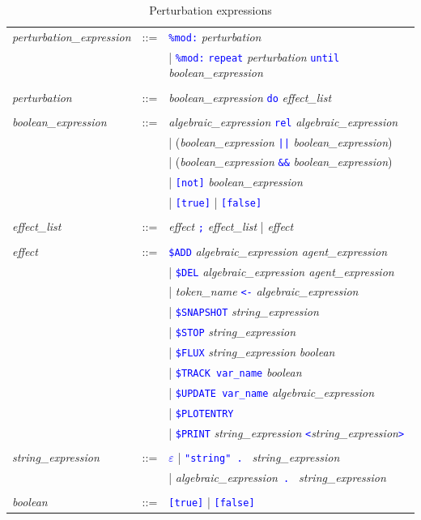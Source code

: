 \documentclass[11pt]{book}
\def\tcb#1{\textcolor{blue}{\ttt{#1}}}
\def\ttt#1{\texttt{#1}}
\def\var#1{{\textquotesingle}#1{\textquotesingle}}
\begin{document}
\begin{table}[htbp]
  \centering
  \caption{Perturbation expressions}
  \begin{tabular}{@{} lcl @{}}
  	\textit{perturbation\_expression} &::=& \tcb{\ttt{\%mod:}} \textit{perturbation} \\
	&& | \tcb{\ttt{\%mod:}} \tcb{\ttt{repeat}} \textit{perturbation} \tcb{\ttt{until}} \textit{boolean\_expression} \\\\

    \textit{perturbation} &::=& \textit{boolean\_expression} \tcb{\ttt{do}} \textit{effect\_list} \\\\
    \textit{boolean\_expression} &::=& \textit{algebraic\_expression}\index{boolean expression} \tcb{rel} \textit{algebraic\_expression} \\
    && | (\textit{boolean\_expression} \tcb{||} \textit{boolean\_expression}) \\
    && | (\textit{boolean\_expression} \tcb{\&\&} \textit{boolean\_expression}) \\
    && | \tcb{[not]} \textit{boolean\_expression} \\
    && | \tcb{[true]} | \tcb{[false]} \\\\
    \textit{effect\_list} &::=& \textit{effect} \tcb{\ttt {;}} \textit{effect\_list} | \textit{effect} \\\\
\textit{effect} &::=& \tcb{\$ADD} \textit{algebraic\_expression agent\_expression} \\
    && | \tcb{\$DEL} \textit{algebraic\_expression agent\_expression} \\
    && | \textit{token\_name} \tcb{<-} \textit{algebraic\_expression} \\
    && | \tcb{\$SNAPSHOT} \textit{string\_expression}\\
    && | \tcb{\$STOP} \textit{string\_expression}\\
	&& | \tcb{\$FLUX} \textit{string\_expression} \textit{boolean} \\
    && | \tcb{\$TRACK \var{var\_name}} \textit{boolean} \\
    && | \tcb{\$UPDATE \var{var\_name}} \textit{algebraic\_expression} \\
    && | \tcb{\$PLOTENTRY} \\
    && | \tcb{\$PRINT} \textit{string\_expression} \tcb{<}\textit{string\_expression}\tcb{>} \\
    \\
    \textit{string\_expression} &::=& \tcb{$\varepsilon$} | \tcb{"string" . } \textit{string\_expression} \\
    && | \textit{algebraic\_expression}\tcb{ . } \textit{string\_expression} \\\\
	\textit{boolean} &::=& \tcb{[true]} | \tcb{[false]}
  \end{tabular}
  \label{tab:pert}
\end{table}
\end{document}
